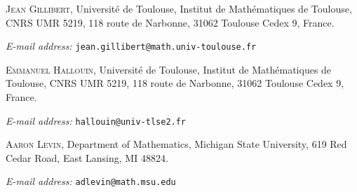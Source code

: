 \documentclass[11pt]{article}
\theoremstyle{plain}
\theoremstyle{definition}
\begin{document}







\bigskip

\textsc{Jean Gillibert}, Universit\'e de Toulouse, Institut de Math{\'e}matiques de Toulouse, CNRS UMR 5219, 118 route de Narbonne, 31062 Toulouse Cedex 9, France.

\emph{E-mail address:} \texttt{jean.gillibert@math.univ-toulouse.fr}
\medskip


\textsc{Emmanuel Hallouin}, Universit\'e de Toulouse, Institut de Math{\'e}matiques de Toulouse, CNRS UMR 5219, 118 route de Narbonne, 31062 Toulouse Cedex 9, France.

\emph{E-mail address:} \texttt{hallouin@univ-tlse2.fr}
\medskip

\textsc{Aaron Levin}, Department of Mathematics, Michigan State University, 619 Red Cedar Road, East Lansing, MI 48824.

\emph{E-mail address:} \texttt{adlevin@math.msu.edu}

\end{document}
